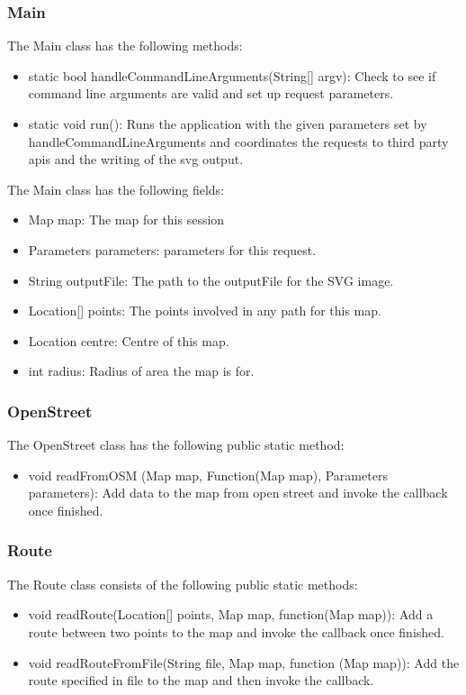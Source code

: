 \documentclass[11pt,twoside,a4paper]{article}
\begin{document}
\subsubsection{Main}
The Main class has the following methods:
\begin{itemize}
\item static bool handleCommandLineArguments(String[] argv): Check to see if
  command line arguments are valid and set up request parameters.
\item static void run(): Runs the application with the given parameters
  set by handleCommandLineArguments and coordinates the requests to
  third party apis and the writing of the svg output.
\end{itemize}
The Main class has the following fields:
\begin{itemize}
\item Map map: The map for this session
\item Parameters parameters: parameters for this request.
\item String outputFile: The path to the outputFile for the SVG image.
\item Location[] points: The points involved in any path for this map.
\item Location centre: Centre of this map.
\item int radius: Radius of area the map is for. 
\end{itemize}
\subsubsection{OpenStreet}
The OpenStreet class has the following public static method:
\begin{itemize}
\item void readFromOSM (Map map, Function(Map map), Parameters
  parameters): Add data to the map from open street and invoke the
  callback once finished.
\end{itemize}

\subsubsection{Route}
The Route class consists of the following public static methods:
\begin{itemize}
\item void readRoute(Location[] points, Map map, function(Map map)): Add a
  route between two points to the map and invoke the callback once finished.
\item void readRouteFromFile(String file, Map map, function (Map map)):
  Add the route specified in file to the map and then invoke the
  callback. 
\end{itemize}
\end{document}
